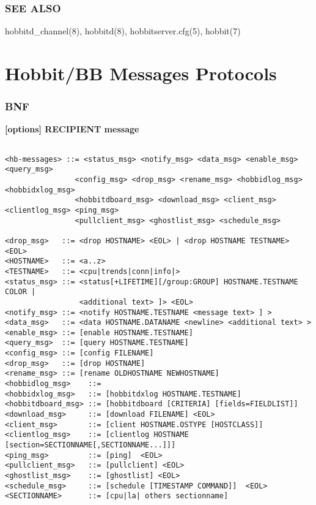 \subsection{SEE ALSO}
hobbitd\_channel(8), hobbitd(8), hobbitserver.cfg(5), hobbit(7) 

 

%

\chapter{Hobbit/BB Messages Protocols}

%
\newpage


\subsection{BNF}
\textbf{ [options] RECIPIENT message}

\begin{verbatim}

<hb-messages> ::= <status_msg> <notify_msg> <data_msg> <enable_msg> <query_msg> 
                <config_msg> <drop_msg> <rename_msg> <hobbidlog_msg> <hobbidxlog_msg> 
                <hobbitdboard_msg> <download_msg> <client_msg> <clientlog_msg> <ping_msg> 
                <pullclient_msg> <ghostlist_msg> <schedule_msg>

<drop_msg>   ::= <drop HOSTNAME> <EOL> | <drop HOSTNAME TESTNAME> <EOL>
<HOSTNAME>   ::= <a..z> 
<TESTNAME>   ::= <cpu|trends|conn|info|> 
<status_msg> ::= <status[+LIFETIME][/group:GROUP] HOSTNAME.TESTNAME COLOR |
                 <additional text> ]> <EOL>
<notify_msg> ::= <notify HOSTNAME.TESTNAME <message text> ] >
<data_msg>   ::= <data HOSTNAME.DATANAME <newline> <additional text> >
<enable_msg> ::= [enable HOSTNAME.TESTNAME]
<query_msg>  ::= [query HOSTNAME.TESTNAME]
<config_msg> ::= [config FILENAME]
<drop_msg>   ::= [drop HOSTNAME]
<rename_msg> ::= [rename OLDHOSTNAME NEWHOSTNAME]
<hobbidlog_msg>    ::= 
<hobbidxlog_msg>   ::= [hobbitdxlog HOSTNAME.TESTNAME]
<hobbitdboard_msg> ::= [hobbitdboard [CRITERIA] [fields=FIELDLIST]]
<download_msg>     ::= [download FILENAME] <EOL>
<client_msg>       ::= [client HOSTNAME.OSTYPE [HOSTCLASS]]
<clientlog_msg>    ::= [clientlog HOSTNAME [section=SECTIONNAME[,SECTIONNAME...]]]
<ping_msg>         ::= [ping]  <EOL>
<pullclient_msg>   ::= [pullclient] <EOL>
<ghostlist_msg>    ::= [ghostlist] <EOL>
<schedule_msg>     ::= [schedule [TIMESTAMP COMMAND]]  <EOL>
<SECTIONNAME>      ::= [cpu|la| others sectionname]

\end{verbatim}

